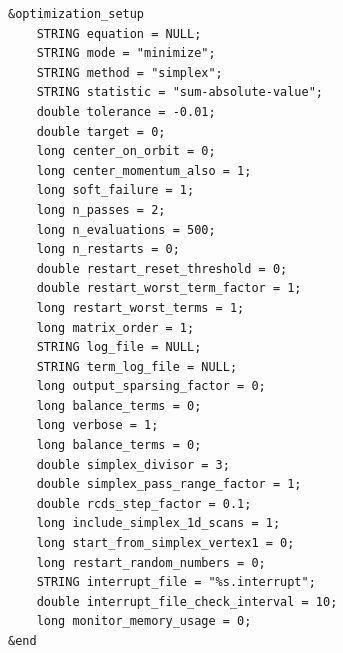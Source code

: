 \documentclass[11pt]{article}
\begin{document}
\begin{verbatim}
&optimization_setup
    STRING equation = NULL;
    STRING mode = "minimize";
    STRING method = "simplex";
    STRING statistic = "sum-absolute-value";
    double tolerance = -0.01;
    double target = 0;
    long center_on_orbit = 0;
    long center_momentum_also = 1;
    long soft_failure = 1;
    long n_passes = 2;
    long n_evaluations = 500; 
    long n_restarts = 0;
    double restart_reset_threshold = 0;
    double restart_worst_term_factor = 1;
    long restart_worst_terms = 1;
    long matrix_order = 1;
    STRING log_file = NULL;
    STRING term_log_file = NULL;
    long output_sparsing_factor = 0;
    long balance_terms = 0;
    long verbose = 1;
    long balance_terms = 0;
    double simplex_divisor = 3;
    double simplex_pass_range_factor = 1;
    double rcds_step_factor = 0.1;
    long include_simplex_1d_scans = 1;
    long start_from_simplex_vertex1 = 0;
    long restart_random_numbers = 0;
    STRING interrupt_file = "%s.interrupt";
    double interrupt_file_check_interval = 10;
    long monitor_memory_usage = 0;
&end
\end{verbatim}
\end{document}
